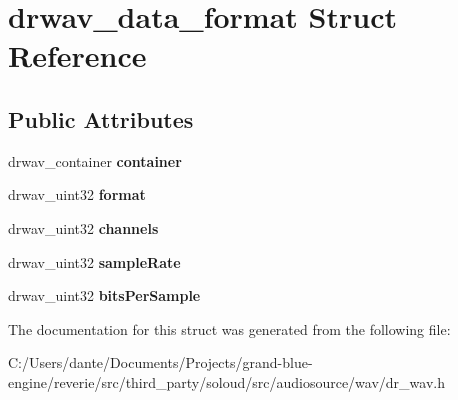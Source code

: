 \hypertarget{structdrwav__data__format}{}\section{drwav\+\_\+data\+\_\+format Struct Reference}
\label{structdrwav__data__format}
\subsection*{Public Attributes}
\begin{DoxyCompactItemize}
\item 
\mbox{\label{structdrwav__data__format_ac1973d5e81f2a89c01a67d8ed11c73f4}} 
drwav\+\_\+container {\bfseries container}
\item 
\mbox{\label{structdrwav__data__format_abc2fcad3dcac30abe6f8a3d03591bb98}} 
drwav\+\_\+uint32 {\bfseries format}
\item 
\mbox{\label{structdrwav__data__format_a13b31399c0f47c1742ee9cfa490d6729}} 
drwav\+\_\+uint32 {\bfseries channels}
\item 
\mbox{\label{structdrwav__data__format_acce462278b2e0403af7fee1ff24312d9}} 
drwav\+\_\+uint32 {\bfseries sample\+Rate}
\item 
\mbox{\label{structdrwav__data__format_a07f788b46635807997eedde130fdd034}} 
drwav\+\_\+uint32 {\bfseries bits\+Per\+Sample}
\end{DoxyCompactItemize}


The documentation for this struct was generated from the following file\+:\begin{DoxyCompactItemize}
\item 
C\+:/\+Users/dante/\+Documents/\+Projects/grand-\/blue-\/engine/reverie/src/third\+\_\+party/soloud/src/audiosource/wav/dr\+\_\+wav.\+h\end{DoxyCompactItemize}
